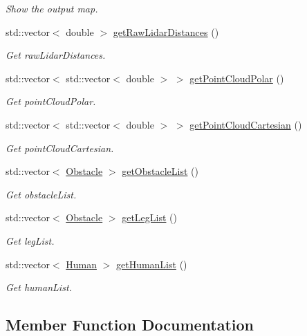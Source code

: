 \begin{DoxyCompactItemize}
\begin{DoxyCompactList}\small\item\em Show the output map. \end{DoxyCompactList}\item 
std\+::vector$<$ double $>$ \hyperlink{classXingyun_a019decd49b73c16a5632006d83d529cf}{get\+Raw\+Lidar\+Distances} ()
\begin{DoxyCompactList}\small\item\em Get raw\+Lidar\+Distances. \end{DoxyCompactList}\item 
std\+::vector$<$ std\+::vector$<$ double $>$ $>$ \hyperlink{classXingyun_a1313253c1365a2223470896892070e96}{get\+Point\+Cloud\+Polar} ()
\begin{DoxyCompactList}\small\item\em Get point\+Cloud\+Polar. \end{DoxyCompactList}\item 
std\+::vector$<$ std\+::vector$<$ double $>$ $>$ \hyperlink{classXingyun_ac26c7bf54cf60382650272b9488a32f2}{get\+Point\+Cloud\+Cartesian} ()
\begin{DoxyCompactList}\small\item\em Get point\+Cloud\+Cartesian. \end{DoxyCompactList}\item 
std\+::vector$<$ \hyperlink{classObstacle}{Obstacle} $>$ \hyperlink{classXingyun_af5631d38103c3bcc312881a940780be8}{get\+Obstacle\+List} ()
\begin{DoxyCompactList}\small\item\em Get obstacle\+List. \end{DoxyCompactList}\item 
std\+::vector$<$ \hyperlink{classObstacle}{Obstacle} $>$ \hyperlink{classXingyun_a7ede3f1d105300c62f5fa313e00dd6f3}{get\+Leg\+List} ()
\begin{DoxyCompactList}\small\item\em Get leg\+List. \end{DoxyCompactList}\item 
std\+::vector$<$ \hyperlink{classHuman}{Human} $>$ \hyperlink{classXingyun_ae50af290dc24fffd479328c91864abfa}{get\+Human\+List} ()
\begin{DoxyCompactList}\small\item\em Get human\+List. \end{DoxyCompactList}\end{DoxyCompactItemize}


\subsection{Member Function Documentation}
